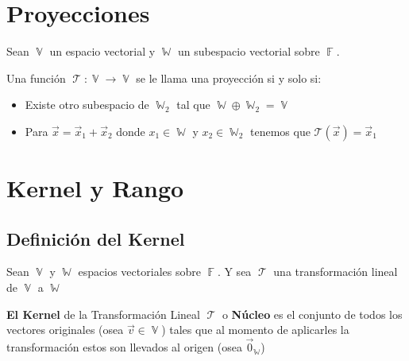 \documentclass[12pt, fleqn]{report}                             %
\theoremstyle{break}                                            %
\DeclareMathOperator \GenericField {\mathbb{F}}                 %
\DeclareMathOperator \VectorSet    {\mathbb{V}}                 %
\DeclareMathOperator \SubVectorSet {\mathbb{W}}                 %
\DeclareMathOperator \LinTrans {\mathcal{T}}                    %
\newcommand{\Wrap}[1]    {\left( #1 \right)}                    %
\newcommand{\FnLinTrans}[1]{\mathcal{T}\Wrap{#1}}               %
\begin{document}
        \clearpage
        \section{Proyecciones}

            
            Sean $\VectorSet$ un espacio vectorial y $\SubVectorSet$ un subespacio vectorial sobre 
            $\GenericField$.

            Una función $\LinTrans: \VectorSet \to \VectorSet$ se le llama una proyección
            si y solo si:
            \begin{itemize}
                \item Existe otro subespacio de $\SubVectorSet_2$ tal que 
                    $\SubVectorSet \oplus \SubVectorSet_2 = \VectorSet$ 
                \item Para $\vec x = \vec x_1 + \vec x_2$ donde $x_1 \in \SubVectorSet$ y 
                    $x_2 \in \SubVectorSet_2$ tenemos que $\FnLinTrans{\vec x} = \vec x_1$
            \end{itemize}


        \clearpage
        \section{Kernel y Rango}

            \clearpage
            \subsection{Definición del Kernel}

                Sean $\VectorSet$ y $\SubVectorSet$ espacios vectoriales sobre $\GenericField$.
                Y sea $\LinTrans$ una transformación lineal de $\VectorSet$ a $\SubVectorSet$

                \textbf{El Kernel} de la Transformación Lineal $\LinTrans$ o \textbf{Núcleo} es el conjunto 
                de todos los vectores originales (osea $\vec v \in \VectorSet$) tales que al momento de
                aplicarles la transformación estos son llevados al origen (osea $\vec 0_{\SubVectorSet}$)
\end{document}

